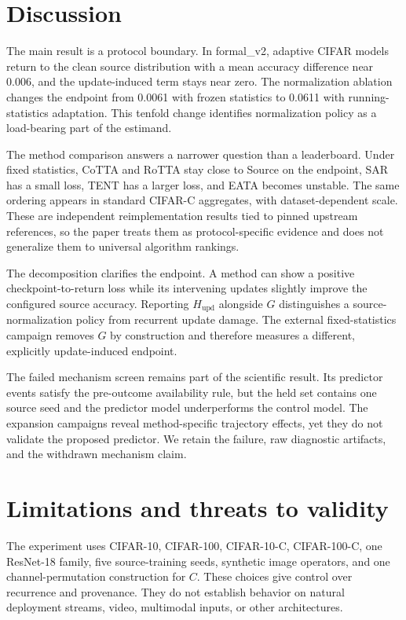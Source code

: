 \documentclass[11pt]{article}
\newcommand{\C}{\ensuremath{C}}
\begin{document}
\section{Discussion}
\label{sec:discussion}

The main result is a protocol boundary. In formal\_v2, adaptive CIFAR models return to the clean source distribution with a mean accuracy difference near 0.006, and the update-induced term stays near zero. The normalization ablation changes the endpoint from 0.0061 with frozen statistics to 0.0611 with running-statistics adaptation. This tenfold change identifies normalization policy as a load-bearing part of the estimand.

The method comparison answers a narrower question than a leaderboard. Under fixed statistics, CoTTA and RoTTA stay close to Source on the endpoint, SAR has a small loss, TENT has a larger loss, and EATA becomes unstable. The same ordering appears in standard CIFAR-C aggregates, with dataset-dependent scale. These are independent reimplementation results tied to pinned upstream references, so the paper treats them as protocol-specific evidence and does not generalize them to universal algorithm rankings.

The decomposition clarifies the endpoint. A method can show a positive checkpoint-to-return loss while its intervening updates slightly improve the configured source accuracy. Reporting $H_{\mathrm{upd}}$ alongside $G$ distinguishes a source-normalization policy from recurrent update damage. The external fixed-statistics campaign removes $G$ by construction and therefore measures a different, explicitly update-induced endpoint.

The failed mechanism screen remains part of the scientific result. Its predictor events satisfy the pre-outcome availability rule, but the held set contains one source seed and the predictor model underperforms the control model. The expansion campaigns reveal method-specific trajectory effects, yet they do not validate the proposed predictor. We retain the failure, raw diagnostic artifacts, and the withdrawn mechanism claim.

\section{Limitations and threats to validity}
\label{sec:threats}

The experiment uses CIFAR-10, CIFAR-100, CIFAR-10-C, CIFAR-100-C, one ResNet-18 family, five source-training seeds, synthetic image operators, and one channel-permutation construction for $\C$. These choices give control over recurrence and provenance. They do not establish behavior on natural deployment streams, video, multimodal inputs, or other architectures.
\end{document}
